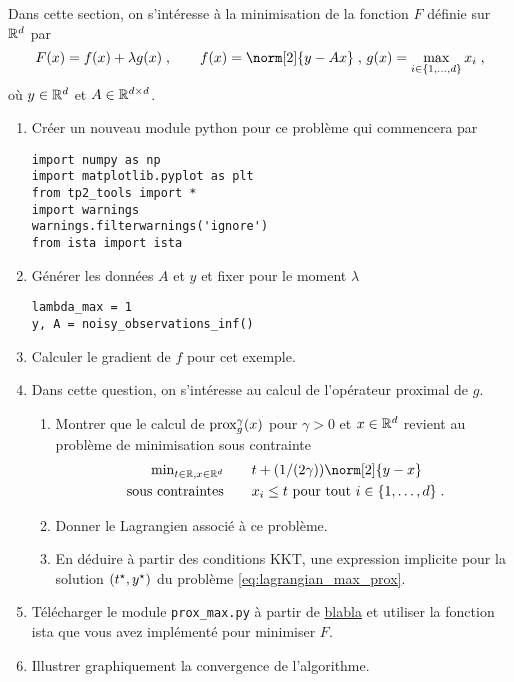 \documentclass[a4paper,french,12pt]{article}
\begin{document}
Dans cette section, on s'intéresse à la minimisation de la fonction $F$ définie sur $\mathbb{R}^d$ par
\begin{equation*}
  F(x) = f(x) + \lambda g(x) \eqsp, \qquad f(x) = \norm[2]{y-Ax} \eqsp, \, g(x)= \max_{i \in \{1,\ldots,d\}} x_i \eqsp,
\end{equation*}
où $y \in \mathbb{R}^d$ et $A \in \mathbb{R}^{d\times d}$. 
\begin{enumerate}
\item Créer un nouveau module python pour ce problème qui commencera par
\begin{lstlisting}
import numpy as np
import matplotlib.pyplot as plt
from tp2_tools import *
import warnings
warnings.filterwarnings('ignore')
from ista import ista
\end{lstlisting}
\item Générer les données $A$ et $y$ et fixer pour le moment $\lambda$
  \begin{lstlisting}
lambda_max = 1
y, A = noisy_observations_inf()
  \end{lstlisting}
\item Calculer le gradient de $f$ pour cet exemple.
\item Dans cette question, on s'intéresse au calcul de l'opérateur proximal de $g$.
  \begin{enumerate}
  \item Montrer que le calcul de $\operatorname{prox}_g^{\gamma}(x)$ pour $\gamma>0$ et $x \in \mathbb{R}^d$ revient au problème de minimisation sous contrainte
    \begin{equation}
      \label{eq:lagrangian_max_prox}
      \begin{aligned}
      \text{min}_{t \in \rset, x \in \rset^d} &\qquad t + (1/(2\gamma)) \norm[2]{y-x} \\
      \text{ sous contraintes} &\qquad x_i \leq t \text{ pour tout $i \in \{1,\ldots,d\}$} \eqsp.
      \end{aligned}
    \end{equation}
  \item Donner le Lagrangien associé à ce problème.
  \item En déduire à partir des conditions KKT, une expression
    implicite pour la solution $(t^{\star},y^{\star})$ du problème \eqref{eq:lagrangian_max_prox}.     
  \end{enumerate}
  
\item Télécharger le module  \lstinline+prox_max.py+ à partir de \url{blabla} et utiliser la fonction ista que vous avez implémenté pour minimiser $F$.
  
\item Illustrer graphiquement la convergence de l'algorithme. 
\end{enumerate}
\end{document}
